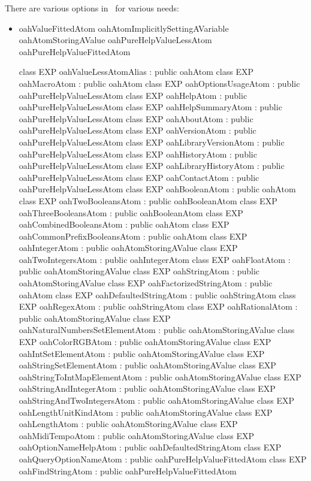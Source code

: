 There are various options in \mr\ for various needs:
\begin{itemize}
\item oahValueFittedAtom
oahAtomImplicitlySettingAVariable
oahAtomStoringAValue
oahPureHelpValueLessAtom
oahPureHelpValueFittedAtom

class EXP oahValueLessAtomAlias : public oahAtom
class EXP oahMacroAtom : public oahAtom
class EXP oahOptionsUsageAtom : public oahPureHelpValueLessAtom
class EXP oahHelpAtom : public oahPureHelpValueLessAtom
class EXP oahHelpSummaryAtom : public oahPureHelpValueLessAtom
class EXP oahAboutAtom : public oahPureHelpValueLessAtom
class EXP oahVersionAtom : public oahPureHelpValueLessAtom
class EXP oahLibraryVersionAtom : public oahPureHelpValueLessAtom
class EXP oahHistoryAtom : public oahPureHelpValueLessAtom
class EXP oahLibraryHistoryAtom : public oahPureHelpValueLessAtom
class EXP oahContactAtom : public oahPureHelpValueLessAtom
class EXP oahBooleanAtom : public oahAtom
class EXP oahTwoBooleansAtom : public oahBooleanAtom
class EXP oahThreeBooleansAtom : public oahBooleanAtom
class EXP oahCombinedBooleansAtom : public oahAtom
class EXP oahCommonPrefixBooleansAtom : public oahAtom
class EXP oahIntegerAtom : public oahAtomStoringAValue
class EXP oahTwoIntegersAtom : public oahIntegerAtom
class EXP oahFloatAtom : public oahAtomStoringAValue
class EXP oahStringAtom : public oahAtomStoringAValue
class EXP oahFactorizedStringAtom : public oahAtom
class EXP oahDefaultedStringAtom : public oahStringAtom
class EXP oahRegexAtom : public oahStringAtom
class EXP oahRationalAtom : public oahAtomStoringAValue
class EXP oahNaturalNumbersSetElementAtom : public oahAtomStoringAValue
class EXP oahColorRGBAtom : public oahAtomStoringAValue
class EXP oahIntSetElementAtom : public oahAtomStoringAValue
class EXP oahStringSetElementAtom : public oahAtomStoringAValue
class EXP oahStringToIntMapElementAtom : public oahAtomStoringAValue
class EXP oahStringAndIntegerAtom : public oahAtomStoringAValue
class EXP oahStringAndTwoIntegersAtom : public oahAtomStoringAValue
class EXP oahLengthUnitKindAtom : public oahAtomStoringAValue
class EXP oahLengthAtom : public oahAtomStoringAValue
class EXP oahMidiTempoAtom : public oahAtomStoringAValue
class EXP oahOptionNameHelpAtom : public oahDefaultedStringAtom
class EXP oahQueryOptionNameAtom : public oahPureHelpValueFittedAtom
class EXP oahFindStringAtom : public oahPureHelpValueFittedAtom


\end{itemize}


